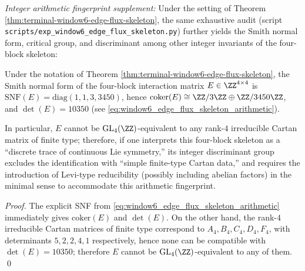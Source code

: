 \emph{Integer arithmetic fingerprint supplement:} Under the setting of Theorem \ref{thm:terminal-window6-edge-flux-skeleton},
the same exhaustive audit (script \texttt{scripts/exp\_window6\_edge\_flux\_skeleton.py}) further yields the Smith normal form, critical group, and discriminant among other integer invariants of the four-block skeleton:


\begin{corollary}\label{cor:window6-edge-flux-skeleton-smith-nonsimple}
Under the notation of Theorem \ref{thm:terminal-window6-edge-flux-skeleton},
the Smith normal form of the four-block interaction matrix \(E\in\ZZ^{4\times 4}\) is
\(\mathrm{SNF}(E)=\mathrm{diag}(1,1,3,3450)\), hence
\(\mathrm{coker}(E)\cong \ZZ/3\ZZ\oplus \ZZ/3450\ZZ\), and \(\det(E)=10350\) (see \eqref{eq:window6_edge_flux_skeleton_arithmetic}).
\par
In particular, \(E\) cannot be \(\mathrm{GL}_4(\ZZ)\)-equivalent to any rank-\(4\) irreducible Cartan matrix of finite type;
therefore, if one interprets this four-block skeleton as a ``discrete trace of continuous Lie symmetry,'' its integer discriminant group excludes the identification with ``simple finite-type Cartan data,''
and requires the introduction of Levi-type reducibility (possibly including abelian factors) in the minimal sense to accommodate this arithmetic fingerprint.
\end{corollary}
\begin{proof}
The explicit SNF from \eqref{eq:window6_edge_flux_skeleton_arithmetic} immediately gives \(\mathrm{coker}(E)\) and \(\det(E)\).
On the other hand, the rank-\(4\) irreducible Cartan matrices of finite type correspond to \(A_4,B_4,C_4,D_4,F_4\), with determinants \(5,2,2,4,1\) respectively,
hence none can be compatible with \(\det(E)=10350\); therefore \(E\) cannot be \(\mathrm{GL}_4(\ZZ)\)-equivalent to any of them. \qed
\end{proof}

